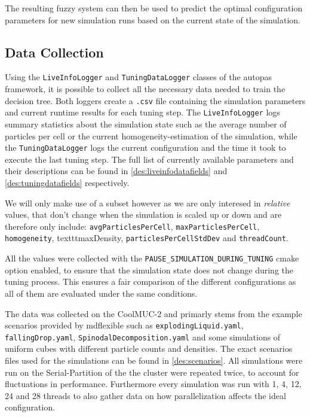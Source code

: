 The resulting fuzzy system can then be used to predict the optimal configuration parameters for new simulation runs based on the current state of the simulation.

\subsection{Data Collection}

Using the \texttt{LiveInfoLogger} and \texttt{TuningDataLogger} classes of the \gls{autopas} framework, it is possible to collect all the necessary data needed to train the decision tree. Both loggers create a \texttt{.csv} file containing the simulation parameters and current runtime results for each tuning step. The \texttt{LiveInfoLogger} logs summary statistics about the simulation state such as the average number of particles per cell or the current homogeneity-estimation of the simulation, while the \texttt{TuningDataLogger} logs the current configuration and the time it took to execute the last tuning step. The full list of currently available parameters and their descriptions can be found in \autoref{des:liveinfodatafields} and \autoref{des:tuningdatafields} respectively.

We will only make use of a subset however as we are only interesed in \emph{relative} values, that don't change when the simulation is scaled up or down and are therefore only include:  \texttt{avgParticlesPerCell}, \texttt{maxParticlesPerCell}, \texttt{homogeneity}, texttt{maxDensity}, \texttt{particlesPerCellStdDev} and \texttt{threadCount}.

All the values were collected with the \texttt{PAUSE\_SIMULATION\_DURING\_TUNING} cmake option enabled, to ensure that the simulation state does not change during the tuning process. This ensures a fair comparison of the different configurations as all of them are evaluated under the same conditions.

The data was collected on the CoolMUC-2  and primarly stems from the example scenarios provided by \gls{mdflexible} such as \texttt{explodingLiquid.yaml}, \texttt{fallingDrop.yaml}, \texttt{SpinodalDecomposition.yaml} and some simulations of uniform cubes with different particle counts and densities. The exact scenarios files used for the simulations can be found in \autoref{des:scenarios}.
All simulations were run on the Serial-Partition of the the cluster were repeated twice, to account for fluctuations in performance. Furthermore every simulation was run with 1, 4, 12, 24 and 28 threads to also gather data on how parallelization affects the ideal configuration.

